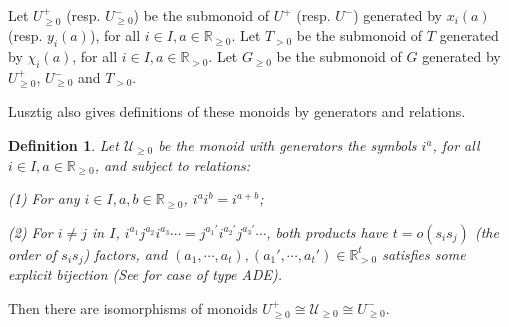 \documentclass[12pt]{amsart}
\newtheorem{definition}[theorem]{Definition}
\begin{document}
Let $U^+_{\geq 0}$ (resp. $U^-_{\geq 0}$) be the submonoid of $U^+$ (resp. $U^-$) generated by $x_i(a)$ (resp. $y_i(a)$), for all $i\in I, a\in \mathbb{R}_{\geq 0}$.
Let $T_{>0}$ be the submonoid of $T$ generated by $\chi_i(a)$, for all $i\in I, a\in \mathbb{R}_{>0}$.
Let $G_{\geq 0}$ be the submonoid of $G$ generated by $U^+_{\geq 0}$, $U^-_{\geq 0}$ and $T_{>0}$.

Lusztig also gives definitions of these monoids by generators and relations.

\begin{definition}\label{u>=0}
    \cite[2.9]{TR2}
    Let $\mathcal{U}_{\geq 0}$ be the monoid with generators the symbols $i^a$, for all $i\in I,a\in \mathbb{R}_{\geq 0}$, and subject to relations:

    (1) For any $i\in I, a,b\in \mathbb{R}_{\geq 0}$, $i^ai^b=i^{a+b}$;

    (2) For $i\neq j$ in $I$, $i^{a_1}j^{a_2}i^{a_3}\cdots = j^{a_1'}i^{a_2'}j^{a_3'}\cdots$, both products have $t=o(s_is_j)$ (the order of $s_is_j$) factors, and $(a_1,\cdots,a_t),(a_1',\cdots,a_t')\in \mathbb{R}_{>0}^t$ satisfies some explicit bijection (See \cite[Proposition 2.5]{TR1} for case of type ADE). 
\end{definition}

Then there are isomorphisms of monoids $U^+_{\geq 0}\cong   \mathcal{U}_{\geq 0}\cong U^-_{\geq 0} $.
\end{document}
